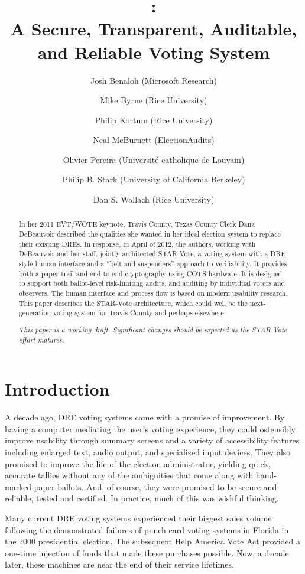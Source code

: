 \documentclass[letterpaper, 10pt, twocolumn]{article}
\title{\projname: \\
A Secure, Transparent, Auditable, and Reliable Voting
System}
\author{
Josh Benaloh (Microsoft Research) \and
Mike Byrne (Rice University) \and
Philip Kortum (Rice University) \and
Neal McBurnett (ElectionAudits) \and
Olivier Pereira (Université catholique de Louvain) \and
Philip B. Stark (University of California Berkeley) \and
Dan S. Wallach (Rice University)}
\newcommand{\projname}{STAR-Vote\xspace}
\begin{document}
\maketitle

\begin{abstract}
In her 2011 EVT/WOTE keynote, Travis County, Texas County Clerk
Dana DeBeauvoir described the qualities she wanted in her ideal election system
to replace their existing DREs.
In response, in April of 2012, the authors, working with DeBeauvoir and her staff,
jointly architected \projname, a voting system with a DRE-style human interface
and a ``belt and suspenders'' approach to verifiability.
It provides both a paper trail and end-to-end cryptography using COTS hardware.
It is designed to support both ballot-level risk-limiting audits,
and auditing by individual voters and observers.
The human interface and process flow is based on modern usability research.
This paper describes the \projname architecture, which could well be
the next-generation voting system for Travis County and perhaps
elsewhere.

{\em This paper is a working draft. Significant changes should be
  expected as the STAR-Vote effort matures.}
\end{abstract}

\section{Introduction}

\label{sec:intro}

A decade ago, DRE voting systems came with a promise of improvement. By having a
computer mediating the user's voting experience, they could ostensibly
improve usability through summary screens and a
variety of accessibility features including enlarged text, audio
output, and specialized input devices. They also promised to improve
the life of the election administrator, yielding quick, accurate tallies without
any of the ambiguities that come along with hand-marked paper ballots.
And, of course, they were promised to be secure and reliable, tested
and certified. In practice, much of this was wishful thinking.

Many current DRE voting systems experienced their biggest sales
volume following the demonstrated failures of punch card voting
systems in Florida in the 2000 presidential election. The subsequent Help America Vote Act
provided a one-time injection of funds that made these purchases
possible. Now, a decade later, these machines are near the end of
their service lifetimes. 
\end{document}
